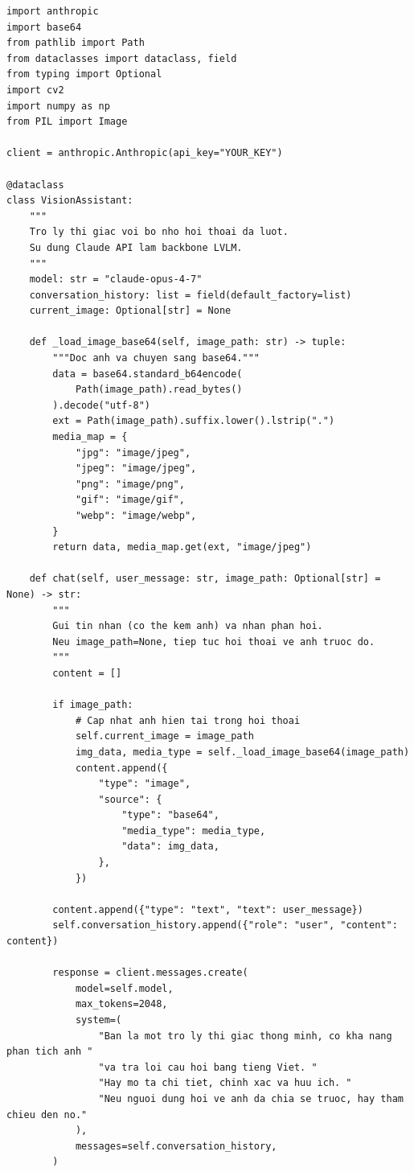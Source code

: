 \begin{verbatim}
import anthropic
import base64
from pathlib import Path
from dataclasses import dataclass, field
from typing import Optional
import cv2
import numpy as np
from PIL import Image

client = anthropic.Anthropic(api_key="YOUR_KEY")

@dataclass
class VisionAssistant:
    """
    Tro ly thi giac voi bo nho hoi thoai da luot.
    Su dung Claude API lam backbone LVLM.
    """
    model: str = "claude-opus-4-7"
    conversation_history: list = field(default_factory=list)
    current_image: Optional[str] = None

    def _load_image_base64(self, image_path: str) -> tuple:
        """Doc anh va chuyen sang base64."""
        data = base64.standard_b64encode(
            Path(image_path).read_bytes()
        ).decode("utf-8")
        ext = Path(image_path).suffix.lower().lstrip(".")
        media_map = {
            "jpg": "image/jpeg",
            "jpeg": "image/jpeg",
            "png": "image/png",
            "gif": "image/gif",
            "webp": "image/webp",
        }
        return data, media_map.get(ext, "image/jpeg")

    def chat(self, user_message: str, image_path: Optional[str] = None) -> str:
        """
        Gui tin nhan (co the kem anh) va nhan phan hoi.
        Neu image_path=None, tiep tuc hoi thoai ve anh truoc do.
        """
        content = []

        if image_path:
            # Cap nhat anh hien tai trong hoi thoai
            self.current_image = image_path
            img_data, media_type = self._load_image_base64(image_path)
            content.append({
                "type": "image",
                "source": {
                    "type": "base64",
                    "media_type": media_type,
                    "data": img_data,
                },
            })

        content.append({"type": "text", "text": user_message})
        self.conversation_history.append({"role": "user", "content": content})

        response = client.messages.create(
            model=self.model,
            max_tokens=2048,
            system=(
                "Ban la mot tro ly thi giac thong minh, co kha nang phan tich anh "
                "va tra loi cau hoi bang tieng Viet. "
                "Hay mo ta chi tiet, chinh xac va huu ich. "
                "Neu nguoi dung hoi ve anh da chia se truoc, hay tham chieu den no."
            ),
            messages=self.conversation_history,
        )


\end{verbatim}
